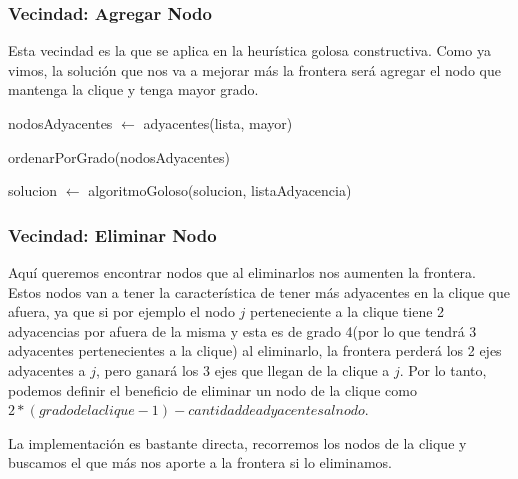 \subsubsection{Vecindad: Agregar Nodo}

Esta vecindad es la que se aplica en la heurística golosa constructiva. Como ya vimos, la solución que nos va a mejorar más la frontera será agregar el nodo que mantenga la clique y tenga mayor grado.

\begin{algorithm}[H]
	\NoCaptionOfAlgo
	\caption{}

    nodosAdyacentes $\leftarrow$ adyacentes(lista, mayor)

    ordenarPorGrado(nodosAdyacentes)

    
    solucion $\leftarrow$ algoritmoGoloso(solucion, listaAdyacencia)
\end{algorithm}

\subsubsection{Vecindad: Eliminar Nodo}

Aquí queremos encontrar nodos que al eliminarlos nos aumenten la frontera. Estos nodos van a tener la característica de tener más adyacentes en la clique que afuera, ya que si por ejemplo el nodo $j$ perteneciente a la clique tiene 2 adyacencias por afuera de la misma y esta es de grado 4(por lo que tendrá 3 adyacentes pertenecientes a la clique) al eliminarlo, la frontera perderá los 2 ejes adyacentes a $j$, pero ganará los 3 ejes que llegan de la clique a $j$. Por lo tanto, podemos definir el beneficio de eliminar un nodo de la clique como $2 * (grado de la clique - 1) - cantidad de adyacentes al nodo$.

La implementación es bastante directa, recorremos los nodos de la clique y buscamos el que más nos aporte a la frontera si lo eliminamos.


